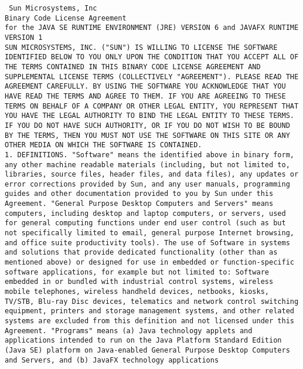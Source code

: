 \setlength{\baselineskip}{0.5\oldbaselineskip}
{\tiny\tt
\noindent
Sun Microsystems, Inc
\\
Binary Code License Agreement
\\
for the JAVA SE RUNTIME ENVIRONMENT (JRE) VERSION 6 and JAVAFX RUNTIME VERSION 1
\\[4pt]
SUN MICROSYSTEMS, INC. ("SUN") IS WILLING TO LICENSE THE SOFTWARE
IDENTIFIED BELOW TO YOU ONLY UPON THE CONDITION THAT YOU ACCEPT ALL OF
THE TERMS CONTAINED IN THIS BINARY CODE LICENSE AGREEMENT AND
SUPPLEMENTAL LICENSE TERMS (COLLECTIVELY "AGREEMENT"). PLEASE READ THE
AGREEMENT CAREFULLY. BY USING THE SOFTWARE YOU ACKNOWLEDGE THAT YOU
HAVE READ THE TERMS AND AGREE TO THEM. IF YOU ARE AGREEING TO THESE
TERMS ON BEHALF OF A COMPANY OR OTHER LEGAL ENTITY, YOU REPRESENT THAT
YOU HAVE THE LEGAL AUTHORITY TO BIND THE LEGAL ENTITY TO THESE
TERMS. IF YOU DO NOT HAVE SUCH AUTHORITY, OR IF YOU DO NOT WISH TO BE
BOUND BY THE TERMS, THEN YOU MUST NOT USE THE SOFTWARE ON THIS SITE OR
ANY OTHER MEDIA ON WHICH THE SOFTWARE IS CONTAINED.
\\[4pt]
   1. DEFINITIONS. "Software" means the identified above in binary
   form, any other machine readable materials (including, but not
   limited to, libraries, source files, header files, and data files),
   any updates or error corrections provided by Sun, and any user
   manuals, programming guides and other documentation provided to you
   by Sun under this Agreement. "General Purpose Desktop Computers and
   Servers" means computers, including desktop and laptop computers,
   or servers, used for general computing functions under end user
   control (such as but not specifically limited to email, general
   purpose Internet browsing, and office suite productivity
   tools). The use of Software in systems and solutions that provide
   dedicated functionality (other than as mentioned above) or designed
   for use in embedded or function-specific software applications, for
   example but not limited to: Software embedded in or bundled with
   industrial control systems, wireless mobile telephones, wireless
   handheld devices, netbooks, kiosks, TV/STB, Blu-ray Disc devices,
   telematics and network control switching equipment, printers and
   storage management systems, and other related systems are excluded
   from this definition and not licensed under this
   Agreement. "Programs" means (a) Java technology applets and
   applications intended to run on the Java Platform Standard Edition
   (Java SE) platform on Java-enabled General Purpose Desktop
   Computers and Servers, and (b) JavaFX technology applications
}
